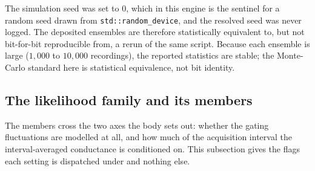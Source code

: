 The simulation seed was set to $0$, which in this engine is the sentinel for a
random seed drawn from \texttt{std::random\_device}, and the resolved seed was
never logged. The deposited ensembles are therefore statistically equivalent to,
but not bit-for-bit reproducible from, a rerun of the same script. Because each
ensemble is large ($1{,}000$ to $10{,}000$ recordings), the reported statistics are
stable; the Monte-Carlo standard here is statistical equivalence, not bit identity.

\subsection*{The likelihood family and its members}

The members cross the two axes the body sets out: whether the gating
fluctuations are modelled at all, and how much of the acquisition interval the
interval-averaged conductance is conditioned on. This subsection gives the flags each
setting is dispatched under and nothing else.

